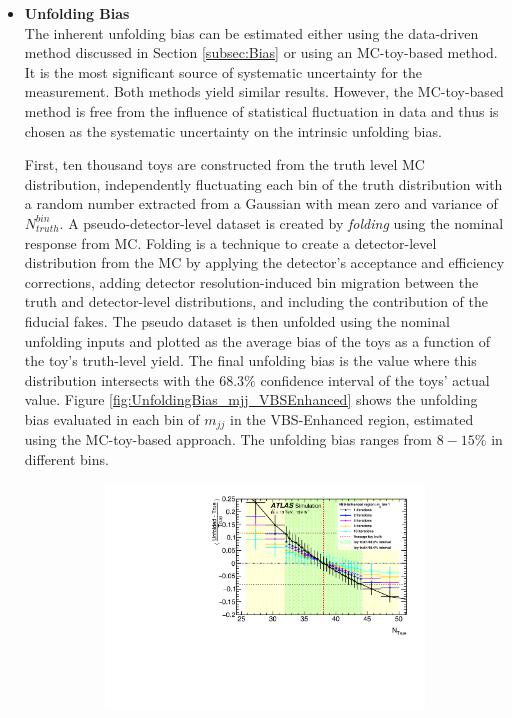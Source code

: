 \begin{itemize}
    \item{\textbf{Unfolding Bias}\\ The inherent unfolding bias can be estimated either using the data-driven method discussed in Section \ref{subsec:Bias} or using an MC-toy-based method. It is the most significant source of systematic uncertainty for the measurement. Both methods yield similar results. However, the MC-toy-based method is free from the influence of statistical fluctuation in data and thus is chosen as the systematic uncertainty on the intrinsic unfolding bias. 

    First, ten thousand toys are constructed from the truth level MC distribution, independently fluctuating each bin of the truth distribution with a random number extracted from a Gaussian with mean zero and variance of $N_{truth}^{bin}$. A pseudo-detector-level dataset is created by \textit{folding} using the nominal response from MC. Folding is a technique to create a detector-level distribution from the MC by applying the detector's acceptance and efficiency corrections, adding detector resolution-induced bin migration between the truth and detector-level distributions, and including the contribution of the fiducial fakes. The pseudo dataset is then unfolded using the nominal unfolding inputs and plotted as the average bias of the toys as a function of the toy's truth-level yield. The final unfolding bias is the value where this distribution intersects with the $68.3\%$ confidence interval of the toys' actual value. Figure \ref{fig:UnfoldingBias_mjj_VBSEnhanced} shows the unfolding bias evaluated in each bin of $m_{jj}$ in the VBS-Enhanced region, estimated using the MC-toy-based approach. The unfolding bias ranges from $8-15\%$ in different bins.
    \begin{figure}[!htb]
        \centering
        \begin{subfigure}{.48\textwidth}
            \centering
            \includegraphics[width=.9\linewidth]{figures/Analysis/Unfolding/unfoldingbias/unfolding_bias_mjj_VBSEnh_bin1.pdf}

\end{subfigure}
\end{figure}}
\end{itemize}
